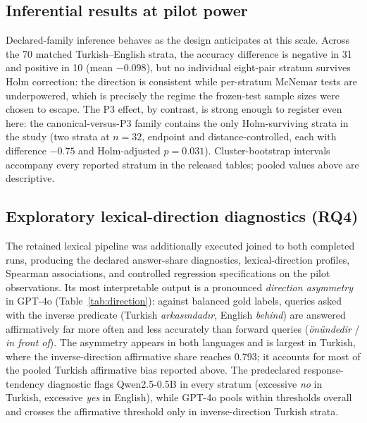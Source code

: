 \subsection{Inferential results at pilot power}

Declared-family inference behaves as the design anticipates at this scale. Across the 70 matched
Turkish--English strata, the accuracy difference is negative in 31 and positive in 10 (mean $-0.098$), but
no individual eight-pair stratum survives Holm correction: the direction is consistent while per-stratum
McNemar tests are underpowered, which is precisely the regime the frozen-test sample sizes were chosen to
escape. The P3 effect, by contrast, is strong enough to register even here: the canonical-versus-P3
family contains the only Holm-surviving strata in the study (two strata at $n = 32$, endpoint and
distance-controlled, each with difference $-0.75$ and Holm-adjusted $p = 0.031$). Cluster-bootstrap
intervals accompany every reported stratum in the released tables; pooled values above are descriptive.

\subsection{Exploratory lexical-direction diagnostics (RQ4)}

The retained lexical pipeline was additionally executed joined to both completed runs, producing the
declared answer-share diagnostics, lexical-direction profiles, Spearman associations, and controlled
regression specifications on the pilot observations. Its most interpretable output is a pronounced
\emph{direction asymmetry} in GPT-4o (Table~\ref{tab:direction}): against balanced gold labels, queries
asked with the inverse predicate (Turkish \emph{arkasındadır}, English \emph{behind}) are answered
affirmatively far more often and less accurately than forward queries (\emph{önündedir} / \emph{in front
of}). The asymmetry appears in both languages and is largest in Turkish, where the inverse-direction
affirmative share reaches 0.793; it accounts for most of the pooled Turkish affirmative bias reported
above. The predeclared response-tendency diagnostic flags Qwen2.5-0.5B in every stratum (excessive
\emph{no} in Turkish, excessive \emph{yes} in English), while GPT-4o pools within thresholds overall and
crosses the affirmative threshold only in inverse-direction Turkish strata.

